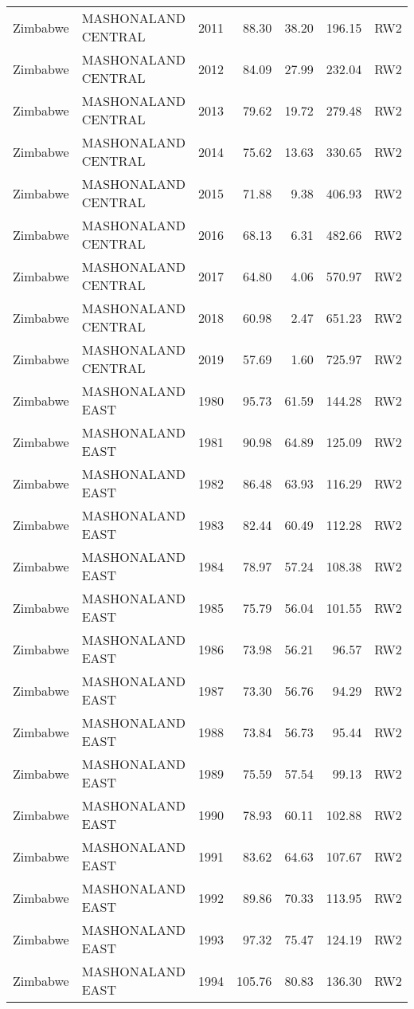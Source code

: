 \begin{longtable}{lllrrrl}
  Zimbabwe & MASHONALAND CENTRAL & 2011 & 88.30 & 38.20 & 196.15 & RW2 \\ 
  Zimbabwe & MASHONALAND CENTRAL & 2012 & 84.09 & 27.99 & 232.04 & RW2 \\ 
  Zimbabwe & MASHONALAND CENTRAL & 2013 & 79.62 & 19.72 & 279.48 & RW2 \\ 
  Zimbabwe & MASHONALAND CENTRAL & 2014 & 75.62 & 13.63 & 330.65 & RW2 \\ 
  Zimbabwe & MASHONALAND CENTRAL & 2015 & 71.88 & 9.38 & 406.93 & RW2 \\ 
  Zimbabwe & MASHONALAND CENTRAL & 2016 & 68.13 & 6.31 & 482.66 & RW2 \\ 
  Zimbabwe & MASHONALAND CENTRAL & 2017 & 64.80 & 4.06 & 570.97 & RW2 \\ 
  Zimbabwe & MASHONALAND CENTRAL & 2018 & 60.98 & 2.47 & 651.23 & RW2 \\ 
  Zimbabwe & MASHONALAND CENTRAL & 2019 & 57.69 & 1.60 & 725.97 & RW2 \\ 
  Zimbabwe & MASHONALAND EAST & 1980 & 95.73 & 61.59 & 144.28 & RW2 \\ 
  Zimbabwe & MASHONALAND EAST & 1981 & 90.98 & 64.89 & 125.09 & RW2 \\ 
  Zimbabwe & MASHONALAND EAST & 1982 & 86.48 & 63.93 & 116.29 & RW2 \\ 
  Zimbabwe & MASHONALAND EAST & 1983 & 82.44 & 60.49 & 112.28 & RW2 \\ 
  Zimbabwe & MASHONALAND EAST & 1984 & 78.97 & 57.24 & 108.38 & RW2 \\ 
  Zimbabwe & MASHONALAND EAST & 1985 & 75.79 & 56.04 & 101.55 & RW2 \\ 
  Zimbabwe & MASHONALAND EAST & 1986 & 73.98 & 56.21 & 96.57 & RW2 \\ 
  Zimbabwe & MASHONALAND EAST & 1987 & 73.30 & 56.76 & 94.29 & RW2 \\ 
  Zimbabwe & MASHONALAND EAST & 1988 & 73.84 & 56.73 & 95.44 & RW2 \\ 
  Zimbabwe & MASHONALAND EAST & 1989 & 75.59 & 57.54 & 99.13 & RW2 \\ 
  Zimbabwe & MASHONALAND EAST & 1990 & 78.93 & 60.11 & 102.88 & RW2 \\ 
  Zimbabwe & MASHONALAND EAST & 1991 & 83.62 & 64.63 & 107.67 & RW2 \\ 
  Zimbabwe & MASHONALAND EAST & 1992 & 89.86 & 70.33 & 113.95 & RW2 \\ 
  Zimbabwe & MASHONALAND EAST & 1993 & 97.32 & 75.47 & 124.19 & RW2 \\ 
  Zimbabwe & MASHONALAND EAST & 1994 & 105.76 & 80.83 & 136.30 & RW2 \\ 

\end{longtable}
